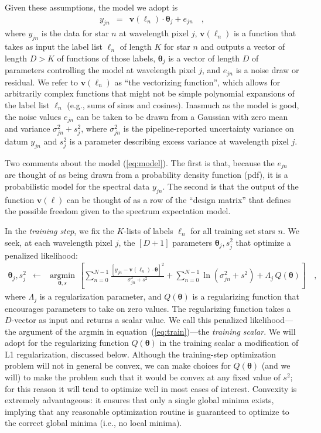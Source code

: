 \documentclass[12pt,preprint]{aastex6}
\newcommand{\Dvector}[1]{\boldsymbol{#1}}
\newcommand{\vectheta}{\Dvector{\theta}}
\newcommand{\vecv}{\Dvector{v}}
\newcommand{\argmin}[1]{\underset{#1}{\operatorname{argmin}}\,}
\begin{document}
\noindent{}Given these assumptions, the model we adopt is
\begin{eqnarray}
  y_{jn} &=& \vecv(\ell_n)\cdot\vectheta_j + e_{jn}
  \label{eq:model}\quad ,
\end{eqnarray}
where $y_{jn}$ is the data for star $n$ at wavelength pixel $j$, $\vecv(\ell_n)$
is a function that takes as input the label list $\ell_n$ of length $K$ for star
$n$ and outputs a vector of length $D>K$ of functions of those labels,
$\vectheta_j$ is a vector of length $D$ of parameters controlling the model at 
wavelength pixel $j$, and $e_{jn}$ is a noise draw or residual.  We refer to 
$\vecv(\ell_n)$ as ``the vectorizing function'', which allows for arbitrarily 
complex functions that might not be simple polynomial expansions of the label 
list $\ell_n$ (e.g., sums of sines and cosines).  Inasmuch as the model is good,
the noise values $e_{jn}$ can be taken to be drawn from a Gaussian with zero 
mean and variance $\sigma^2_{jn}+s^2_j$, where $\sigma^2_{jn}$ is the 
pipeline-reported uncertainty variance on datum $y_{jn}$ and $s^2_j$ is a 
parameter describing excess variance at wavelength pixel $j$.


Two comments about the model (\ref{eq:model}).  The first is that, because the 
$e_{jn}$ are thought of as being drawn from a probability density function (pdf),
it is a probabilistic model for the spectral data $y_{jn}$.  The second is that
the output of the function $\vecv(\ell)$ can be thought of as a row of the 
``design matrix'' that defines the possible freedom given to the spectrum 
expectation model.


In the \emph{training step}, we fix the $K$-lists of labels $\ell_n$ for all 
training set stars $n$.  We seek, at each wavelength pixel $j$, the $[D+1]$ 
parameters $\vectheta_j,s^2_j$ that optimize a penalized likelihood:
\begin{eqnarray}\label{eq:train}
  \vectheta_j,s^2_j &\leftarrow& \argmin{\vectheta,s}\left[
    \sum_{n=0}^{N-1} \frac{[y_{jn}-\vecv(\ell_n)\cdot\vectheta]^2}{\sigma^2_{jn}+s^2}
    + \sum_{n=0}^{N-1} \ln(\sigma^2_{jn}+s^2)
    + \Lambda_j\,Q(\vectheta)
    \right]
  \quad ,
\end{eqnarray}
where $\Lambda_j$ is a regularization parameter, and $Q(\vectheta)$ is a 
regularizing function that encourages parameters to take on zero values.  The 
regularizing function takes a $D$-vector as input and returns a scalar value.
We call this penalized likelihood---the argument of the argmin in 
equation~(\ref{eq:train})---the \emph{training scalar}.  We will adopt for the 
regularizing function $Q(\vectheta)$ in the training scalar a modification of L1
regularization, discussed below.  Although the training-step optimization 
problem will not in general be convex, we can make choices for $Q(\vectheta)$ 
(and we will) to make the problem such that it would be convex at any fixed 
value of $s^2$; for this reason it will tend to optimize well in most cases of 
interest. Convexity is extremely advantageous: it ensures that only a single
global minima exists, implying that any reasonable optimization routine is
guaranteed to optimize to the correct global minima (i.e., no local minima).
\end{document}
